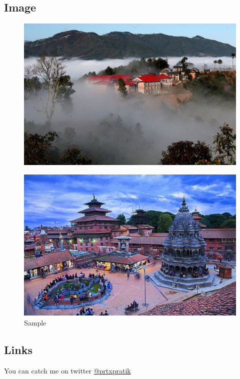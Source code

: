 \documentclass[11pt]{article}
\begin{document}
\subsection{Image}

\begin{figure}
\centering
\includegraphics[width=\textwidth]{sample.jpg}
\end{figure}
\begin{figure}
\centering
\includegraphics[width=\textwidth]{sample2.jpeg}
\caption{Sample}
\end{figure}

\subsection{Links}

You can catch me on twitter \href{https://twitter.com/prtxpratik}{@prtxpratik}
\end{document}
